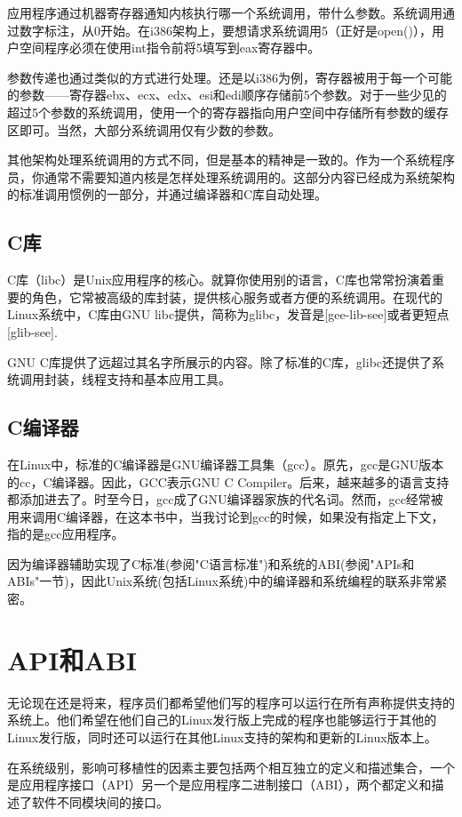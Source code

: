 应用程序通过机器寄存器通知内核执行哪一个系统调用，带什么参数。系统调用通过数字标注，从0开始。在i386架构上，要想请求系统调用5（正好是open()），用户空间程序必须在使用int指令前将5填写到eax寄存器中。

参数传递也通过类似的方式进行处理。还是以i386为例，寄存器被用于每一个可能的参数——寄存器ebx、ecx、edx、esi和edi顺序存储前5个参数。对于一些少见的超过5个参数的系统调用，使用一个的寄存器指向用户空间中存储所有参数的缓存区即可。当然，大部分系统调用仅有少数的参数。

其他架构处理系统调用的方式不同，但是基本的精神是一致的。作为一个系统程序员，你通常不需要知道内核是怎样处理系统调用的。这部分内容已经成为系统架构的标准调用惯例的一部分，并通过编译器和C库自动处理。 

\subsection{C库}

C库（libc）是Unix应用程序的核心。就算你使用别的语言，C库也常常扮演着重要的角色，它常被高级的库封装，提供核心服务或者方便的系统调用。在现代的Linux系统中，C库由GNU libc提供，简称为glibc，发音是[gee-lib-see]或者更短点[glib-see].

GNU C库提供了远超过其名字所展示的内容。除了标准的C库，glibc还提供了系统调用封装，线程支持和基本应用工具。 

\subsection{C编译器}
在Linux中，标准的C编译器是GNU编译器工具集（gcc）。原先，gcc是GNU版本的cc，C编译器。因此，GCC表示GNU C Compiler。后来，越来越多的语言支持都添加进去了。时至今日，gcc成了GNU编译器家族的代名词。然而，gcc经常被用来调用C编译器，在这本书中，当我讨论到gcc的时候，如果没有指定上下文，指的是gcc应用程序。


因为编译器辅助实现了C标准(参阅"C语言标准")和系统的ABI(参阅"APIs和ABIs"一节)，因此Unix系统(包括Linux系统)中的编译器和系统编程的联系非常紧密。 

\section{API和ABI}
无论现在还是将来，程序员们都希望他们写的程序可以运行在所有声称提供支持的系统上。他们希望在他们自己的Linux发行版上完成的程序也能够运行于其他的Linux发行版，同时还可以运行在其他Linux支持的架构和更新的Linux版本上。

在系统级别，影响可移植性的因素主要包括两个相互独立的定义和描述集合，一个是应用程序接口（API）另一个是应用程序二进制接口（ABI），两个都定义和描述了软件不同模块间的接口。 

